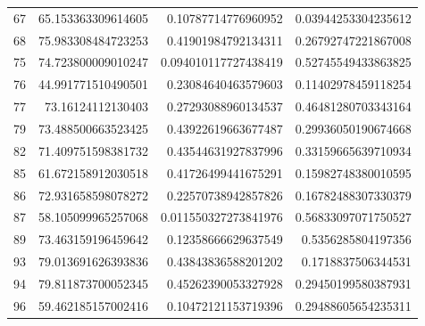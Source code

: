 \begin{table}[p]
\begin{tabular}{rrrr}
67 & 65.153363309614605 & 0.10787714776960952 & 0.03944253304235612 \\
68 & 75.983308484723253 & 0.41901984792134311 & 0.26792747221867008 \\
75 & 74.723800009010247 & 0.094010117727438419 & 0.52745549433863825 \\
76 & 44.991771510490501 & 0.23084640463579603 & 0.11402978459118254 \\
77 & 73.16124112130403 & 0.27293088960134537 & 0.46481280703343164 \\
79 & 73.488500663523425 & 0.43922619663677487 & 0.29936050190674668 \\
82 & 71.409751598381732 & 0.43544631927837996 & 0.33159665639710934 \\
85 & 61.672158912030518 & 0.41726499441675291 & 0.15982748380010595 \\
86 & 72.931658598078272 & 0.22570738942857826 & 0.16782488307330379 \\
87 & 58.105099965257068 & 0.011550327273841976 & 0.56833097071750527 \\
89 & 73.463159196459642 & 0.12358666629637549 & 0.5356285804197356 \\
93 & 79.013691626393836 & 0.43843836588201202 & 0.1718837506344531 \\
94 & 79.811873700052345 & 0.45262390053327928 & 0.29450199580387931 \\
96 & 59.462185157002416 & 0.10472121153719396 & 0.29488605654235311 \\
\bottomrule
\end{tabular}
\end{table}
